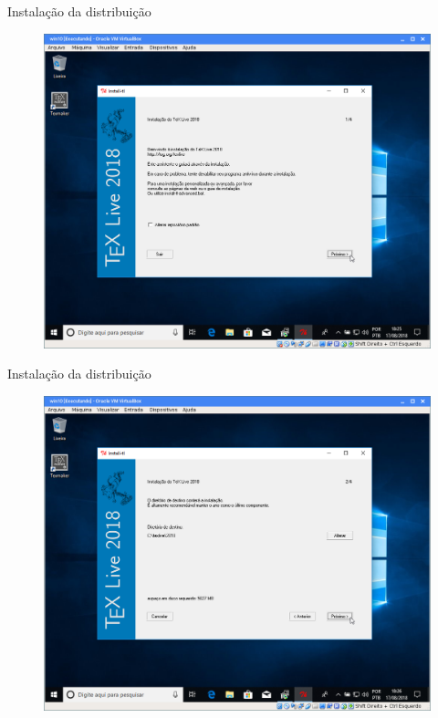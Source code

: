\documentclass{beamer}
\begin{document}

\begin{frame}{Instala\c{c}\~ao da distribui\c{c}\~ao}
    \begin{figure}[h]
        \includegraphics[scale=0.25]{fig/texlive-04.png}
    \end{figure}
\end{frame}

\begin{frame}{Instala\c{c}\~ao da distribui\c{c}\~ao}
    \begin{figure}[h]
        \includegraphics[scale=0.25]{fig/texlive-05.png}
    \end{figure}
\end{frame}
\end{document}
